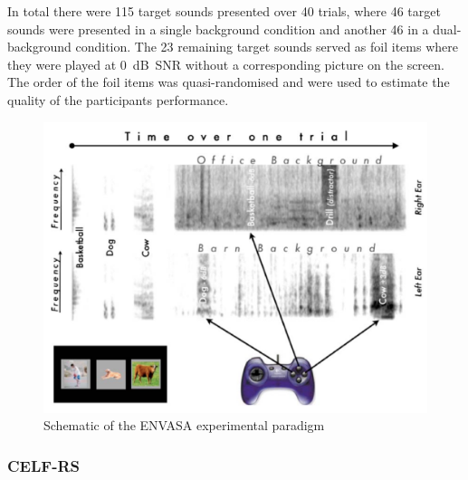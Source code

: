 \documentclass[a4paper, twoside]{templates/ociamthesis}
\begin{document}
In total there were 115 target sounds presented over 40 trials, where 46 target sounds were presented in a single background condition and another 46 in a dual-background condition. The 23 remaining target sounds served as foil items where they were played at 0~dB~SNR without a corresponding picture on the screen. The order of the foil items was quasi-randomised and were used to estimate the quality of the participants performance.



\begin{figure}

{\centering \includegraphics[width=0.65\linewidth]{figures/ENVASAparadigm} 

}

\caption{Schematic of the ENVASA experimental paradigm \autocite[taken from][]{Leech2009}}\label{fig:ENVASA}
\end{figure}

\hypertarget{celf-rs}{%
\subsubsection{CELF-RS}\label{celf-rs}}
\end{document}

